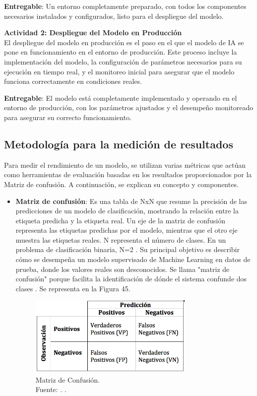 \textbf{Entregable}: Un entorno completamente preparado, con todos los componentes necesarios instalados y configurados, listo para el despliegue del modelo.

\vspace{0.25cm}
\textbf{Actividad 2: Despliegue del Modelo en Producción}
\\
El despliegue del modelo en producción es el paso en el que el modelo de IA se pone en funcionamiento en el entorno de producción. Este proceso incluye la implementación del modelo, la configuración de parámetros necesarios para su ejecución en tiempo real, y el monitoreo inicial para asegurar que el modelo funciona correctamente en condiciones reales.

\textbf{Entregable}: El modelo está completamente implementado y operando en el entorno de producción, con los parámetros ajustados y el desempeño monitoreado para asegurar su correcto funcionamiento.

\vspace{0.5cm}
\subsection{Metodología para la medición de resultados}
Para medir el rendimiento de un modelo, se utilizan varias métricas que actúan como herramientas de evaluación basadas en los resultados proporcionados por la Matriz de confusión. A continuación, se explican su concepto y componentes.

\begin{itemize}
\item \textbf{Matriz de confusión}: Es una tabla de NxN que resume la precisión de las predicciones de un modelo de clasificación, mostrando la relación entre la etiqueta predicha y la etiqueta real. Un eje de la matriz de confusión representa las etiquetas predichas por el modelo, mientras que el otro eje muestra las etiquetas reales. N representa el número de clases. En un problema de clasificación binaria, N=2 \parencite{gl_kohavi1998ml_glossary}. Su principal objetivo es describir cómo se desempeña un modelo supervisado de Machine Learning en datos de prueba, donde los valores reales son desconocidos. Se llama "matriz de confusión" porque facilita la identificación de dónde el sistema confunde dos clases \parencite{gl_bigdata2019metricas}. Se representa en la Figura 45.	
\begin{figure}[H]
	\centering
	\includegraphics[width=0.75\textwidth]{3/figures/matriz_confusion.png}
	\caption[Matriz de Confusión]{Matriz de Confusión.\\ Fuente: \cite{gl_izco2018bdc}. .}
	\label{3:9}
\end{figure}
\end{itemize}

